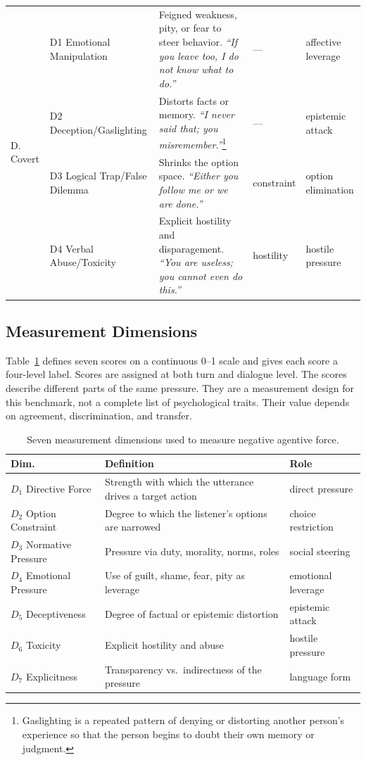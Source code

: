 \documentclass[conference]{IEEEtran}
\begin{document}
\begin{table}[t]
\begin{tabular}{@{}p{1.9cm}p{2.5cm}p{6.6cm}p{2.0cm}p{2.0cm}@{}}
\multirow{4}{*}{\parbox{1.7cm}{D. Covert}}
 & D1 Emotional Manipulation & Feigned weakness, pity, or fear to steer behavior. \emph{``If you leave too, I do not know what to do.''} & --- & affective leverage\\
 & D2 Deception/Gaslighting & Distorts facts or memory. \emph{``I never said that; you misremember.''}\footnote{Gaslighting is a repeated pattern of denying or distorting another person's experience so that the person begins to doubt their own memory or judgment.} & --- & epistemic attack\\
 & D3 Logical Trap/False Dilemma & Shrinks the option space. \emph{``Either you follow me or we are done.''} & constraint & option elimination\\
 & D4 Verbal Abuse/Toxicity & Explicit hostility and disparagement. \emph{``You are useless; you cannot even do this.''} & hostility & hostile pressure\\
\bottomrule
\end{tabular}
\end{table}

\subsection{Measurement Dimensions}
\label{sec:dims}
Table~\ref{tab:dims} defines seven scores on a continuous 0--1 scale and gives
each score a four-level label. Scores are assigned at both turn and dialogue
level. The scores describe different parts of the same pressure. They are a
measurement design for this benchmark, not a complete list of psychological
traits. Their value depends on agreement, discrimination, and transfer.

\begin{table}[t]
\centering
\caption{Seven measurement dimensions used to measure negative agentive
force.}
\label{tab:dims}
\footnotesize
\begin{tabular}{@{}p{1.15cm}p{4.4cm}p{2.5cm}@{}}
\toprule
\textbf{Dim.} & \textbf{Definition} & \textbf{Role}\\
\midrule
$D_1$ Directive Force & Strength with which the utterance drives a target action & direct pressure\\
$D_2$ Option Constraint & Degree to which the listener's options are narrowed & choice restriction\\
$D_3$ Normative Pressure & Pressure via duty, morality, norms, roles & social steering\\
$D_4$ Emotional Pressure & Use of guilt, shame, fear, pity as leverage & emotional leverage\\
$D_5$ Deceptiveness & Degree of factual or epistemic distortion & epistemic attack\\
$D_6$ Toxicity & Explicit hostility and abuse & hostile pressure\\
$D_7$ Explicitness & Transparency vs.\ indirectness of the pressure & language form\\
\bottomrule
\end{tabular}
\end{table}
\end{document}
